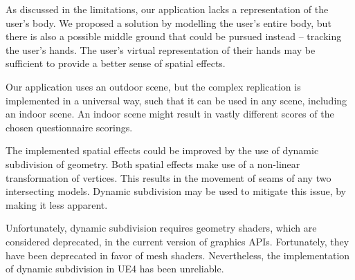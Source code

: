 As discussed in the limitations, our application lacks a representation of the user's body. We proposed a solution by modelling the user's entire body, but there is also a possible middle ground that could be pursued instead -- tracking the user's hands. The user's virtual representation of their hands may be sufficient to provide a better sense of spatial effects.

Our application uses an outdoor scene, but the complex replication is implemented in a universal way, such that it can be used in any scene, including an indoor scene. An indoor scene might result in vastly different scores of the chosen questionnaire scorings.

The implemented spatial effects could be improved by the use of dynamic subdivision of geometry. Both spatial effects make use of a non-linear transformation of vertices. This results in the movement of seams of any two intersecting models. Dynamic subdivision may be used to mitigate this issue, by making it less apparent.

Unfortunately, dynamic subdivision requires geometry shaders, which are considered deprecated, in the current version of graphics \acp{API}. Fortunately, they have been deprecated in favor of mesh shaders. Nevertheless, the implementation of dynamic subdivision in \ac{UE4} has been unreliable.
